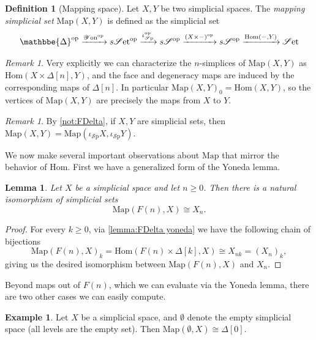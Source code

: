 \documentclass[11pt, a4paper]{amsart}
\def\DDelta{{\mathbbe{\Delta}}}
\newcommand{\DD}{\DDelta}
\newcommand{\Hom}{\mathrm{Hom}}
\newcommand{\Map}{\mathrm{Map}}
\newcommand{\op}{\mathrm{op}}
\newcommand{\Set}{\mathscr{S}\mathrm{et}}
\newcommand{\Yon}{\mathscr{Y}\mathrm{on}}
\newcommand{\sSet}{s\mathscr{S}\mathrm{et}}
\newcommand{\sSp}{s\mathscr{S}}
\newcommand{\incspace}{\iota_{\mathscr{S}\mathrm{p}}}
\newtheorem{lemma}[equation]{Lemma}
\theoremstyle{definition}
\newtheorem{definition}[equation]{Definition}
\newtheorem{example}[equation]{Example}
\theoremstyle{remark}
\newtheorem{remark}[equation]{Remark}
\numberwithin{equation}{section}
\begin{document}
\begin{definition}[Mapping space] \label{def:mapping space}
  Let $X,Y$ be two simplicial spaces. The \emph{mapping simplicial set} $\Map(X,Y)$ is defined as the simplicial set 
  \[ \DD^{\op} \xrightarrow{ \Yon^{\op} } \sSet^{\op} \xrightarrow{\incspace^{\op}}  \sSp^{\op} \xrightarrow{ (X \times -)^{\op}} \sSp^{\op} \xrightarrow{ \Hom(-,Y)} \Set\]
\end{definition}

\begin{remark} \label{rem:mapping space explicit}
  Very explicitly we can characterize the $n$-simplices of $\Map(X,Y)$ as $\Hom(X \times \Delta[n], Y)$, and the face and degeneracy maps are induced by the corresponding maps of $\Delta[n]$. In particular $\Map(X,Y)_0 = \Hom(X,Y)$, so the vertices of $\Map(X,Y)$ are precisely the maps from $X$ to $Y$.
\end{remark}

\begin{remark}
 By \cref{not:FDelta}, if $X,Y$ are simplicial sets, then $\Map(X,Y) = \Map(\incspace X, \incspace Y)$. 
\end{remark}

We now make several important observations about $\Map$ that mirror the behavior of $\Hom$. First we have a generalized form of the Yoneda lemma.

\begin{lemma} \label{lemma:map yoneda}
  Let $X$ be a simplicial space and let $n \geq 0$. Then there is a natural isomorphism of simplicial sets
  \[\Map(F(n), X) \cong X_n.\]
\end{lemma}

\begin{proof}
 For every $k \geq 0$, via \cref{lemma:FDelta yoneda} we have the following chain of bijections
 \[ \Map(F(n), X)_k = \Hom(F(n) \times \Delta[k], X) \cong X_{nk} = (X_n)_k,\]
 giving us the desired isomorphism between $\Map(F(n), X)$ and $X_n$.
\end{proof}

Beyond maps out of $F(n)$, which we can evaluate via the Yoneda lemma, there are two other cases we can easily compute.

\begin{example} \label{ex:initial}
  Let $X$ be a simplicial space, and $\emptyset$ denote the empty simplicial space (all levels are the empty set). Then $\Map(\emptyset, X) \cong \Delta[0]$.
\end{example}
\end{document}
